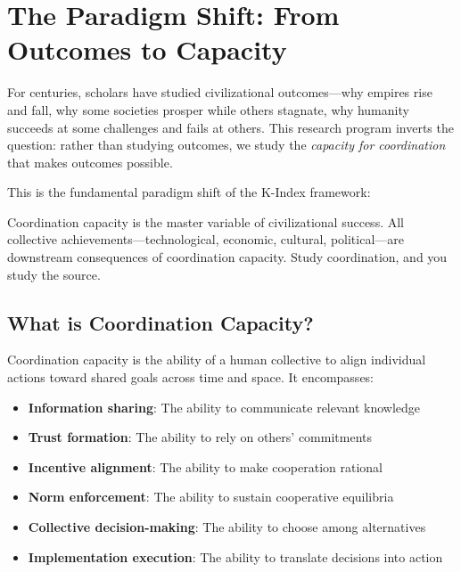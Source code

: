 \documentclass[12pt,letterpaper]{article}
\begin{document}
\section{The Paradigm Shift: From Outcomes to Capacity}

For centuries, scholars have studied civilizational outcomes---why empires rise and fall, why some societies prosper while others stagnate, why humanity succeeds at some challenges and fails at others. This research program inverts the question: rather than studying outcomes, we study the \textit{capacity for coordination} that makes outcomes possible.

This is the fundamental paradigm shift of the K-Index framework:

\begin{lawbox}
Coordination capacity is the master variable of civilizational success. All collective achievements---technological, economic, cultural, political---are downstream consequences of coordination capacity. Study coordination, and you study the source.
\end{lawbox}

\subsection{What is Coordination Capacity?}

Coordination capacity is the ability of a human collective to align individual actions toward shared goals across time and space. It encompasses:

\begin{itemize}
    \item \textbf{Information sharing}: The ability to communicate relevant knowledge
    \item \textbf{Trust formation}: The ability to rely on others' commitments
    \item \textbf{Incentive alignment}: The ability to make cooperation rational
    \item \textbf{Norm enforcement}: The ability to sustain cooperative equilibria
    \item \textbf{Collective decision-making}: The ability to choose among alternatives
    \item \textbf{Implementation execution}: The ability to translate decisions into action
\end{itemize}
\end{document}
